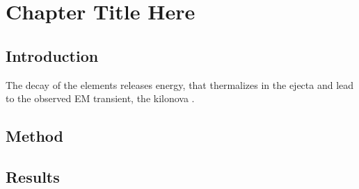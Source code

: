 
\chapter{Chapter Title Here} %

\label{ch:kilonova} %


\section{Introduction}


The decay of the \rproc{} elements releases energy, that thermalizes in the ejecta 
and lead to the observed \ac{EM} transient, the kilonova \citep[\eg][]{Metzger:2016pju}.




\section{Method}


\section{Results}